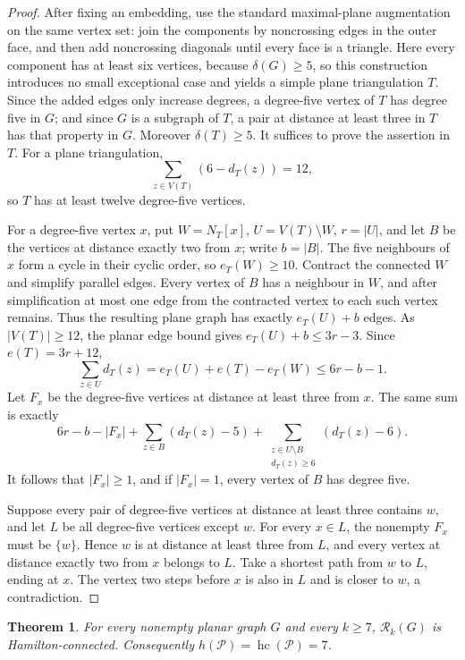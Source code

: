 \documentclass[11pt]{article}
\newtheorem{theorem}{Theorem}[section]
\theoremstyle{remark}
\newcommand{\Rk}{\mathcal R_k}
\newcommand{\hc}{\operatorname{hc}}
\numberwithin{equation}{section}
\numberwithin{table}{section}
\begin{document}
\begin{proof}
After fixing an embedding, use the standard maximal-plane augmentation
on the same vertex set: join the components by noncrossing edges in the
outer face, and then add noncrossing diagonals until every face is a
triangle.  Here every component has at least six vertices, because
$\delta(G)\ge5$, so this construction introduces no small exceptional
case and yields a simple plane triangulation $T$.  Since the added edges
only increase degrees, a degree-five vertex of $T$ has degree five in
$G$; and since $G$ is a subgraph of $T$, a pair at distance at least
three in $T$ has that property in $G$.  Moreover $\delta(T)\ge5$.  It
suffices to prove the assertion in $T$.  For a plane triangulation,
\[
\sum_{z\in V(T)}(6-d_T(z))=12,
\]
so $T$ has at least twelve degree-five vertices.

For a degree-five vertex $x$, put $W=N_T[x]$, $U=V(T)\setminus W$,
$r=|U|$, and let $B$ be the vertices at distance exactly two from $x$;
write $b=|B|$.  The five neighbours of $x$ form a cycle in their cyclic
order, so $e_T(W)\ge10$.  Contract the connected $W$ and simplify
parallel edges.  Every vertex of $B$ has a neighbour in $W$, and after
simplification at most one edge from the contracted vertex to each such
vertex remains.  Thus the resulting plane graph has exactly
$e_T(U)+b$ edges.  As $|V(T)|\ge12$, the planar edge bound gives
$e_T(U)+b\le3r-3$.  Since $e(T)=3r+12$,
\[
 \sum_{z\in U}d_T(z)
 =e_T(U)+e(T)-e_T(W)\le6r-b-1.
\]
Let $F_x$ be the degree-five vertices at distance at least three from
$x$.  The same sum is exactly
\[
 6r-b-|F_x|
 +\sum_{z\in B}(d_T(z)-5)
 +\sum_{\substack{z\in U\setminus B\\ d_T(z)\ge6}}(d_T(z)-6).
\]
It follows that $|F_x|\ge1$, and if $|F_x|=1$, every vertex of $B$
has degree five.

Suppose every pair of degree-five vertices at distance at least three
contains $w$, and let $L$ be all degree-five vertices except $w$.
For every $x\in L$, the nonempty $F_x$ must be $\{w\}$.  Hence
$w$ is at distance at least three from $L$, and every vertex at distance
exactly two from $x$ belongs to $L$.  Take a shortest path from $w$
to $L$, ending at $x$.  The vertex two steps before $x$ is also in
$L$ and is closer to $w$, a contradiction.
\end{proof}

\begin{theorem}
\label{thm:planar-hc}
For every nonempty planar graph $G$ and every $k\ge7$, $\Rk(G)$ is
Hamilton-connected.  Consequently
$h(\mathcal P)=\hc(\mathcal P)=7$.
\end{theorem}
\end{document}

